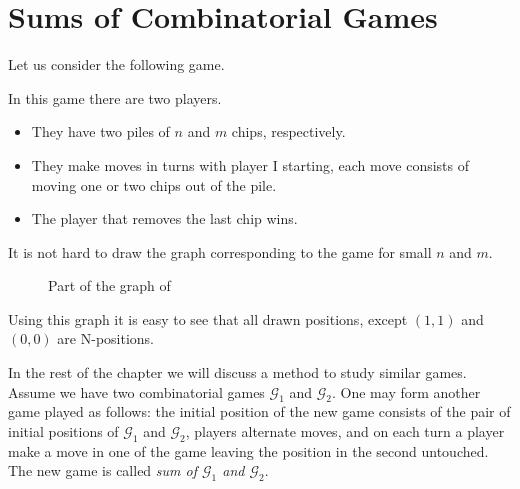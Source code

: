\chapter{Sums of Combinatorial Games}


Let us consider the following game.
\begin{game}
\label{game:two-pile-take-away-n-m-2-1}
  In this game there are two players.
  \begin{itemize}
    \item They have two piles of $n$ and $m$ chips, respectively.
    \item They make moves in turns with player I starting,
      each move consists of moving one or two chips out of the pile.
    \item The player that removes the last chip wins.
  \end{itemize}
\end{game}
It is not hard to draw the graph corresponding to the game for small $n$ and
$m$.
\begin{figure}
  \centering
  \caption{Part of the graph of }
\end{figure}
Using this graph it is easy to see that all drawn positions, except $(1, 1)$ and
$(0, 0)$ are N-positions.

In the rest of the chapter we will discuss a method to study similar games.
Assume we have two combinatorial games $\mathcal{G}_1$ and $\mathcal{G}_2$.
One may form another game played as follows: the initial position of the new game
consists of the pair of initial positions of $\mathcal{G}_1$ and $\mathcal{G}_2$,
players alternate moves, and on each turn a player make a move in one of the game
leaving the position in the second untouched.  The new game is called
\emph{sum of $\mathcal{G}_1$ and $\mathcal{G}_2$}.

